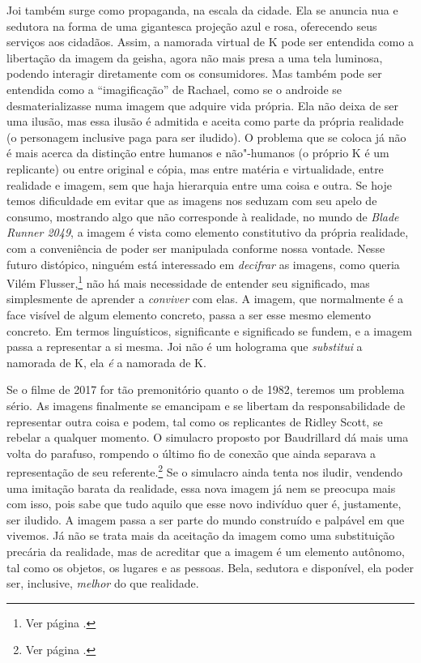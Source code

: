 Joi também surge como propaganda, na escala da cidade. Ela se anuncia
nua e sedutora na forma de uma gigantesca projeção azul e rosa,
oferecendo seus serviços aos cidadãos. Assim, a namorada virtual de K
pode ser entendida como a libertação da imagem da geisha, agora não mais
presa a uma tela luminosa, podendo interagir diretamente com os
consumidores. Mas também pode ser entendida como a ``imagificação'' de
Rachael, como se o androide se desmaterializasse numa imagem que adquire
vida própria. Ela não deixa de ser uma ilusão, mas essa ilusão é
admitida e aceita como parte da própria realidade (o personagem
inclusive paga para ser iludido). O problema que se coloca já não é mais
acerca da distinção entre humanos e não"-humanos (o próprio K é um
replicante) ou entre original e cópia, mas entre matéria e virtualidade,
entre realidade e imagem, sem que haja hierarquia entre uma coisa e
outra. Se hoje temos dificuldade em evitar que as imagens nos seduzam
com seu apelo de consumo, mostrando algo que não corresponde à
realidade, no mundo de \emph{Blade Runner 2049}, a imagem é vista como
elemento constitutivo da própria realidade, com a conveniência de poder
ser manipulada conforme nossa vontade. Nesse futuro distópico, ninguém
está interessado em \emph{decifrar} as imagens, como queria Vilém
Flusser,\footnote{Ver página \pageref{decifradas}.} não há mais necessidade de entender
seu significado, mas simplesmente de aprender a \emph{conviver} com
elas. A imagem, que normalmente é a face visível de algum elemento
concreto, passa a ser esse mesmo elemento concreto. Em termos
linguísticos, significante e significado se fundem, e a imagem passa a
representar a si mesma. Joi não é um holograma que \emph{substitui} a
namorada de K, ela \emph{é} a namorada de K.

Se o filme de 2017 for tão premonitório quanto o de 1982, teremos um
problema sério. As imagens finalmente se emancipam e se libertam da
responsabilidade de representar outra coisa e podem, tal como os
replicantes de Ridley Scott, se rebelar a qualquer momento. O simulacro proposto por Baudrillard dá mais uma volta do parafuso, rompendo o
último fio de conexão que ainda separava a representação de seu
referente.\footnote{Ver página \pageref{saturacao}.} Se o simulacro ainda tenta nos
iludir, vendendo uma imitação barata da realidade, essa nova imagem já
nem se preocupa mais com isso, pois sabe que tudo aquilo que esse novo
indivíduo quer é, justamente, ser iludido. A imagem passa a ser parte do
mundo construído e palpável em que vivemos. Já não se trata mais da
aceitação da imagem como uma substituição precária da realidade, mas de
acreditar que a imagem é um elemento autônomo, tal como os objetos, os
lugares e as pessoas. Bela, sedutora e disponível, ela poder ser,
inclusive, \emph{melhor} do que realidade.


